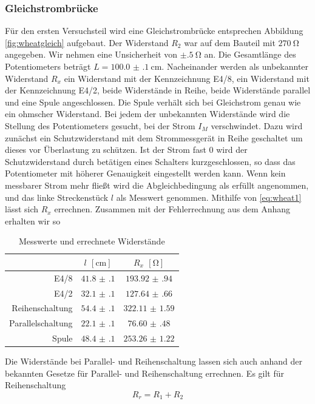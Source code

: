 \subsubsection{Gleichstrombrücke}
Für den ersten Versuchsteil wird eine Gleichstrombrücke entsprechen Abbildung \ref{fig:wheatgleich} aufgebaut. Der Widerstand $ R_2 $ war auf dem Bauteil mit $ \SI{270}{\ohm} $ angegeben. Wir nehmen eine Unsicherheit von $ \pm\SI{.5}{\ohm} $ an. Die Gesamtlänge des Potentiometers beträgt $ L = \SI{100.0(1)}{\centi\meter} $. Nacheinander werden als unbekannter Widerstand $ R_x $ ein Widerstand mit der Kennzeichnung E4/8, ein Widerstand mit der Kennzeichnung E4/2, beide Widerstände in Reihe, beide Widerstände parallel und eine Spule angeschlossen. Die Spule verhält sich bei Gleichstrom genau wie ein ohmscher Widerstand. Bei jedem der unbekannten Widerstände wird die Stellung des Potentiometers gesucht, bei der Strom $ I_M $ verschwindet. Dazu wird zunächst ein Schutzwiderstand mit dem Strommessgerät in Reihe geschaltet um dieses vor Überlastung zu schützen. Ist der Strom fast $ 0 $ wird der Schutzwiderstand durch betätigen eines Schalters kurzgeschlossen, so dass das Potentiometer mit höherer Genauigkeit eingestellt werden kann. Wenn kein messbarer Strom mehr fließt wird die Abgleichbedingung als erfüllt angenommen, und das linke Streckenstück $ l $ als Messwert genommen. Mithilfe von \eqref{eq:wheat1} lässt sich $ R_x $ errechnen. Zusammen mit der Fehlerrechnung aus dem Anhang erhalten wir so
\begin{table}[H]
	\centering
	\begin{tabular}{r|cc}
		 & $ l $ $ [\si{\centi\meter}] $ & $ R_x $ $ [\si{\ohm}] $ \\\hline
		E4/8 & $ \num{41.8(1)} $ & $ \num{193.92(94)} $\\
		E4/2 & $ \num{32.1(1)} $ & $ \num{127.64(66)} $\\
		Reihenschaltung & $ \num{54.4(1)} $ & $ \num{322.11(159)} $\\
		Parallelschaltung & $ \num{22.1(1)} $ & $ \num{76.60(48)} $\\
		Spule & $ \num{48.4(1)} $ & $ \num{253.26(122)} $
	\end{tabular}
	\caption{Messwerte und errechnete Widerstände}
\end{table}
Die Widerstände bei Parallel- und Reihenschaltung lassen sich auch anhand der bekannten Gesetze für Parallel- und Reihenschaltung errechnen. Es gilt für Reihenschaltung
\begin{equation*}
	R_r = R_1 + R_2
\end{equation*}
